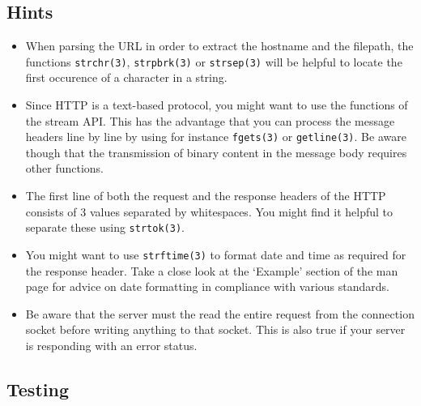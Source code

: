 \subsection*{Hints}
\begin{itemize}
\item When parsing the URL
in order to extract the hostname and the filepath,
the functions \verb|strchr(3)|, \verb|strpbrk(3)| or \verb|strsep(3)|
will be helpful to locate the first occurence of a character in a string.

\item Since HTTP is a text-based protocol,
you might want to use the functions of the stream API.
This has the advantage that you can process the message headers line by line
by using for instance \verb|fgets(3)| or \verb|getline(3)|.
Be aware though that the transmission of binary content
in the message body requires other functions.

\item The first line of both the request and the response headers of the HTTP
consists of 3 values separated by whitespaces.
You might find it helpful to separate these using \verb|strtok(3)|.

\item You might want to use \verb|strftime(3)|
to format date and time as required for the response header.
Take a close look at the `Example' section of the man page
for advice on date formatting in compliance with various standards.

\item Be aware that the server must the read the entire request
from the connection socket before writing anything to that socket.
This is also true if your server is responding with an error status.

\end{itemize}

\clearpage
\subsection*{Testing}

